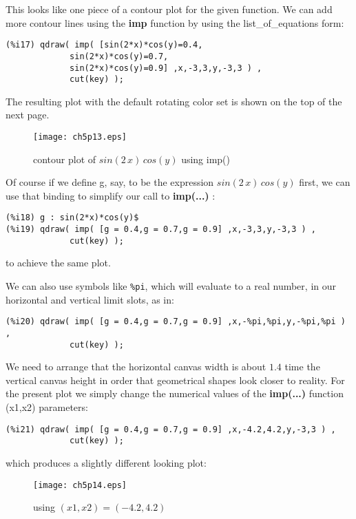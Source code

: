 \documentclass[12pt]{article}
\begin{document}
\smallskip
This looks like one piece of a contour plot for the given function.
We can add more contour lines using the \textbf{imp} function by using
  the list\_of\_equations form:
\small
\begin{verbatim}
(%i17) qdraw( imp( [sin(2*x)*cos(y)=0.4,
             sin(2*x)*cos(y)=0.7,
             sin(2*x)*cos(y)=0.9] ,x,-3,3,y,-3,3 ) ,
             cut(key) );
\end{verbatim}
\normalsize
The resulting plot with the default rotating color set is shown on the top
  of the next page.
\newpage


\begin{figure} [h]
   \centerline{\texttt{[image: ch5p13.eps]} }
	\caption{contour plot of $sin(2\,x)\,cos(y)$ using imp() }
\end{figure}      

Of course if we define g, say, to be the expression $sin(2\,x)\,cos(y)$ first,
  we can use that binding to simplify our call to \textbf{imp(...) }:
\small
\begin{verbatim}
(%i18) g : sin(2*x)*cos(y)$
(%i19) qdraw( imp( [g = 0.4,g = 0.7,g = 0.9] ,x,-3,3,y,-3,3 ) ,
             cut(key) );
\end{verbatim}
\normalsize
to achieve the same plot.

\smallskip
We can also use symbols like \verb|%pi|, which will evaluate to a real number,
  in our horizontal and vertical limit slots, as in:
\small
\begin{verbatim}
(%i20) qdraw( imp( [g = 0.4,g = 0.7,g = 0.9] ,x,-%pi,%pi,y,-%pi,%pi ) ,
             cut(key) );
\end{verbatim}
\normalsize
We need to arrange that the horizontal canvas width is about $1.4$ time the vertical
  canvas height in order that geometrical shapes look closer to reality.
For the present plot we simply change the numerical values of the \textbf{imp(...)}
  function (x1,x2) parameters:
\small
\begin{verbatim}
(%i21) qdraw( imp( [g = 0.4,g = 0.7,g = 0.9] ,x,-4.2,4.2,y,-3,3 ) ,
             cut(key) );
\end{verbatim}
\normalsize
which produces a slightly different looking plot:

\begin{figure} [h]
   \centerline{\texttt{[image: ch5p14.eps]} }
	\caption{using $(x1,x2) = (-4.2,4.2)$ }
\end{figure}      


\newpage
\end{document}
